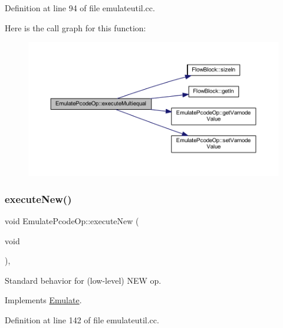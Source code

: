 Definition at line 94 of file emulateutil.\+cc.

Here is the call graph for this function\+:
\nopagebreak
\begin{figure}[H]
\begin{center}
\leavevmode
\includegraphics[width=350pt]{class_emulate_pcode_op_a0d8951da9a7c253ad8bf4892fff9760a_cgraph}
\end{center}
\end{figure}
\mbox{\label{class_emulate_pcode_op_a7aecdf665942b8b429e02d3f56fce887}} 
\subsubsection{\texorpdfstring{executeNew()}{executeNew()}}
{\footnotesize\ttfamily void Emulate\+Pcode\+Op\+::execute\+New (\begin{DoxyParamCaption}\item[{void}]{ }\end{DoxyParamCaption})\hspace{0.3cm}{\ttfamily [protected]}, {\ttfamily [virtual]}}



Standard behavior for (low-\/level) N\+EW op. 



Implements \mbox{\hyperlink{class_emulate_ad6d1b182791e6d69b6469ea159729372}{Emulate}}.



Definition at line 142 of file emulateutil.\+cc.

\mbox{\label{class_emulate_pcode_op_a4335b878ca40061dcde8f45fabb82e16}} 
